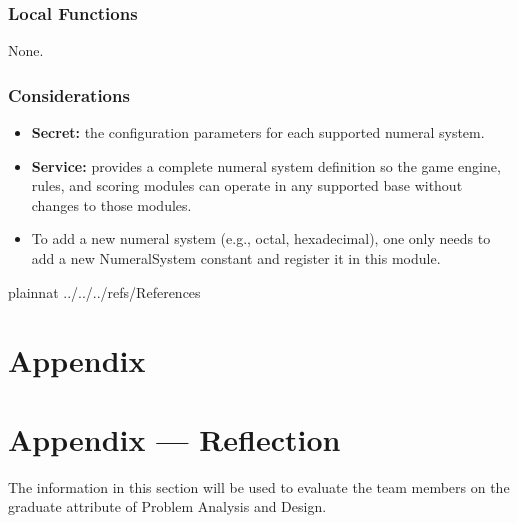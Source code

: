 \documentclass[12pt, titlepage]{article}
\begin{document}
\subsubsection{Local Functions}
None.

\subsubsection{Considerations}
\begin{itemize}
    \item \textbf{Secret:} the configuration parameters for each supported numeral system.
    \item \textbf{Service:} provides a complete numeral system definition so the game engine, rules, and scoring modules can operate in any supported base without changes to those modules.
    \item To add a new numeral system (e.g., octal, hexadecimal), one only needs to add a new NumeralSystem constant and register it in this module.
\end{itemize}

\newpage

 {plainnat}
 {../../../refs/References}

\newpage

\section{Appendix} \label{Appendix}


\newpage{}

\section*{Appendix --- Reflection}


The information in this section will be used to evaluate the team members on the
graduate attribute of Problem Analysis and Design.


\end{document}
